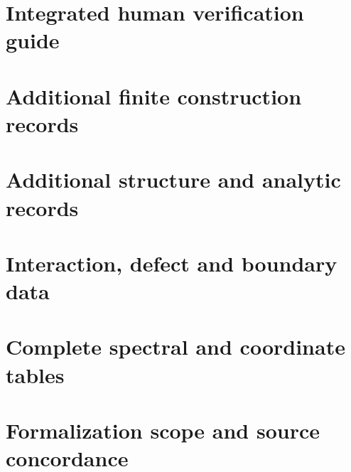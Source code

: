 \documentclass[11pt,a4paper]{article}
\theoremstyle{definition}
\begin{document}
\clearpage
\renewcommand{\thesection}{S\arabic{section}}
\renewcommand{\theHsection}{supplement.\arabic{section}}
\setcounter{section}{0}
\part{Integrated human verification guide}

\clearpage
\part{Additional finite construction records}
\begingroup
\setlength{\extrarowheight}{1.5pt}

\clearpage
\part{Additional structure and analytic records}

\clearpage
\part{Interaction, defect and boundary data}

\clearpage
\part{Complete spectral and coordinate tables}



\endgroup
\clearpage
\part{Formalization scope and source concordance}


\clearpage
{}

\end{document}
